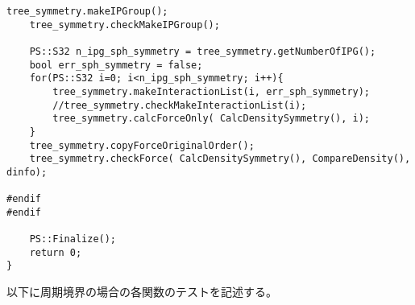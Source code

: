\begin{lstlisting}[caption=開放境界、モートンソート、ローカルツリー構築、モーメント計算、LET交換、グローバルツリー構築、相互作用計算のテスト]
    tree_symmetry.makeIPGroup();
    tree_symmetry.checkMakeIPGroup();

    PS::S32 n_ipg_sph_symmetry = tree_symmetry.getNumberOfIPG();
    bool err_sph_symmetry = false;
    for(PS::S32 i=0; i<n_ipg_sph_symmetry; i++){
        tree_symmetry.makeInteractionList(i, err_sph_symmetry);
        //tree_symmetry.checkMakeInteractionList(i);
        tree_symmetry.calcForceOnly( CalcDensitySymmetry(), i);
    }
    tree_symmetry.copyForceOriginalOrder();
    tree_symmetry.checkForce( CalcDensitySymmetry(), CompareDensity(), dinfo);

#endif
#endif

    PS::Finalize();
    return 0;
}

\end{lstlisting}


以下に周期境界の場合の各関数のテストを記述する。

